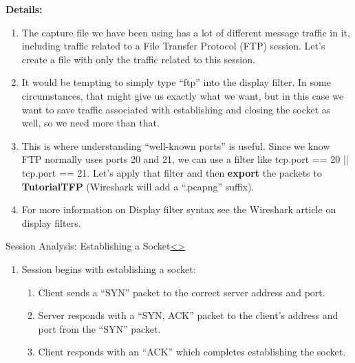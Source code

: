 \documentclass[12pt]{extarticle}
\newenvironment{instructionblock}{\Large\bgroup}{\egroup}
\newcommand{\ben}{\begin{enumerate}}
\newcommand{\een}{\end{enumerate}}
\begin{document}
\vspace{6mm}
\noindent
\textbf{Details:}

\ben

\item The capture file we have been using has a lot of different message traffic in it, including traffic related to a File Transfer Protocol (FTP) session.  Let's create a file with only the traffic related to this session.  

\item It would be tempting to simply type ``ftp'' into the display filter.  In some circumstances, that might give us exactly what we want, but in this case we want to save traffic associated with establishing and closing the socket as well, so we need more than that.  

\item This is where understanding ``well-known ports'' is useful.  Since we know FTP normally uses ports 20 and 21, we can use a filter like tcp.port == 20 || tcp.port == 21.  Let's apply that filter and then \textbf{export} the packets to \textbf{TutorialTFP} (Wireshark will add a ``.pcapng'' suffix).

\item For more information on Display filter syntax see the Wireshark article on display filters. \cite{displayFilters}

\een



\pagebreak
\begin{slide}{Session Analysis: Establishing a Socket}{\hyperref[slide 18]{\textless}\hyperref[slide 20]{\textgreater}}
\begin{instructionblock}
\begin{enumerate}
\item Session begins with establishing a socket:
\ben
\item Client sends a ``SYN'' packet to the correct server address and port.
\item Server responds with a ``SYN, ACK'' packet to the client's address and port from the ``SYN'' packet.
\item Client responds with an ``ACK'' which completes establishing the socket.
\een
\end{enumerate}
\end{instructionblock}
\end{slide}
\end{document}
